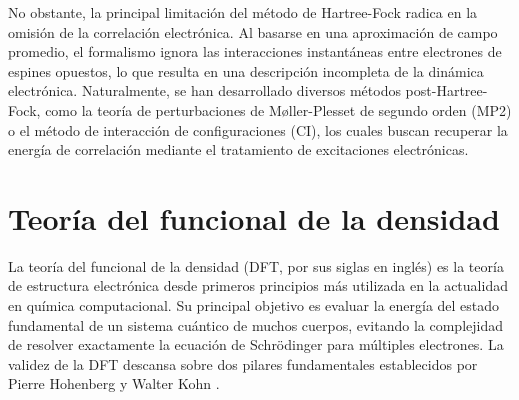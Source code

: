 No obstante, la principal limitación del método de Hartree-Fock radica en la omisión de la correlación electrónica. Al basarse en una aproximación de campo promedio, el formalismo ignora las interacciones instantáneas entre electrones de espines opuestos, lo que resulta en una descripción incompleta de la dinámica electrónica. Naturalmente, se han desarrollado diversos métodos post-Hartree-Fock, como la teoría de perturbaciones de Møller-Plesset de segundo orden (MP2) o el método de interacción de configuraciones (CI), los cuales buscan recuperar la energía de correlación mediante el tratamiento de excitaciones electrónicas.

\section{Teoría del funcional de la densidad}

La teoría del funcional de la densidad (DFT, por sus siglas en inglés) es la teoría de estructura electrónica desde primeros principios más utilizada en la actualidad en química computacional. Su principal objetivo es evaluar la energía del estado fundamental de un sistema cuántico de muchos cuerpos, evitando la complejidad de resolver exactamente la ecuación de Schrödinger para múltiples electrones. 
La validez de la DFT descansa sobre dos pilares fundamentales establecidos por Pierre Hohenberg y Walter Kohn \cite{jensen2017introduction}.
 
